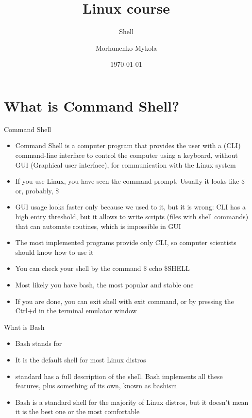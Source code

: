 \documentclass[usenames,dvipsnames,10pt,aspectratio=169]{beamer}
\title{Linux course}
\subtitle{Shell}
\date[\today]{\small\today}
\author[Morhunenko Mykola]{Morhunenko Mykola}
\institute{APPS@UCU}
\begin{document}
\begin{frame}
\titlepage
\end{frame}

\begin{frame}{\contentsname}
\tableofcontents
\end{frame}

\section{What is Command Shell?}

\begin{frame}{Command Shell}
\begin{itemize}
    \item Command Shell is a computer program that provides the user with a (CLI) command-line interface to control the computer using a keyboard, without GUI (Graphical user interface), for communication with the Linux system
    \item If you use Linux, you have seen the command prompt. Usually it looks like {\color{ucugreen}\$} or, probably, {\color{ucugreen} \$}
    \item GUI usage looks faster only because we used to it, but it is wrong: CLI has a high entry threshold, but it allows to write scripts (files with shell commands) that can automate routines, which is impossible in GUI
    \item The most implemented programs provide only CLI, so computer scientists should know how to use it
    \item You can check your shell by the command {\color{ucugreen} \$ echo \$SHELL}
    \item Most likely you have {\color{ucugreen} bash}, the most popular and stable one
    \item If you are done, you can exit shell with {\color{ucugreen} exit} command, or by pressing the {\color{ucugreen}Ctrl+d} in the terminal emulator window
\end{itemize}
\end{frame}

\begin{frame}{What is Bash}
\begin{itemize}
    \item Bash stands for
    \item It is the default shell for most Linux distros
    \item {} standard has a full description of the shell. Bash implements all these features, plus something of its own, known as {\color{ucugreen} bashism}
    \item Bash is a standard shell for the majority of Linux distros, but it doesn't mean it is the best one or the most comfortable
\end{itemize}
\end{frame}
\end{document}
